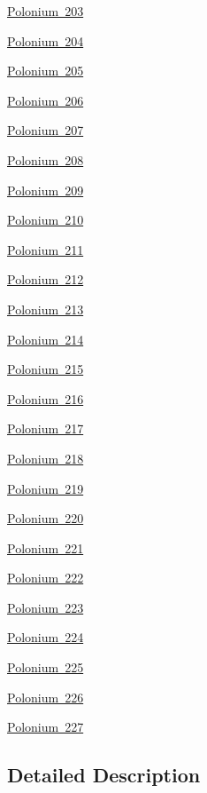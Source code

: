 \begin{DoxyCompactItemize}
\mbox{\hyperlink{group___isotope_const-_polonium-_po203}{Polonium 203}}
\item 
\mbox{\hyperlink{group___isotope_const-_polonium-_po204}{Polonium 204}}
\item 
\mbox{\hyperlink{group___isotope_const-_polonium-_po205}{Polonium 205}}
\item 
\mbox{\hyperlink{group___isotope_const-_polonium-_po206}{Polonium 206}}
\item 
\mbox{\hyperlink{group___isotope_const-_polonium-_po207}{Polonium 207}}
\item 
\mbox{\hyperlink{group___isotope_const-_polonium-_po208}{Polonium 208}}
\item 
\mbox{\hyperlink{group___isotope_const-_polonium-_po209}{Polonium 209}}
\item 
\mbox{\hyperlink{group___isotope_const-_polonium-_po210}{Polonium 210}}
\item 
\mbox{\hyperlink{group___isotope_const-_polonium-_po211}{Polonium 211}}
\item 
\mbox{\hyperlink{group___isotope_const-_polonium-_po212}{Polonium 212}}
\item 
\mbox{\hyperlink{group___isotope_const-_polonium-_po213}{Polonium 213}}
\item 
\mbox{\hyperlink{group___isotope_const-_polonium-_po214}{Polonium 214}}
\item 
\mbox{\hyperlink{group___isotope_const-_polonium-_po215}{Polonium 215}}
\item 
\mbox{\hyperlink{group___isotope_const-_polonium-_po216}{Polonium 216}}
\item 
\mbox{\hyperlink{group___isotope_const-_polonium-_po217}{Polonium 217}}
\item 
\mbox{\hyperlink{group___isotope_const-_polonium-_po218}{Polonium 218}}
\item 
\mbox{\hyperlink{group___isotope_const-_polonium-_po219}{Polonium 219}}
\item 
\mbox{\hyperlink{group___isotope_const-_polonium-_po220}{Polonium 220}}
\item 
\mbox{\hyperlink{group___isotope_const-_polonium-_po221}{Polonium 221}}
\item 
\mbox{\hyperlink{group___isotope_const-_polonium-_po222}{Polonium 222}}
\item 
\mbox{\hyperlink{group___isotope_const-_polonium-_po223}{Polonium 223}}
\item 
\mbox{\hyperlink{group___isotope_const-_polonium-_po224}{Polonium 224}}
\item 
\mbox{\hyperlink{group___isotope_const-_polonium-_po225}{Polonium 225}}
\item 
\mbox{\hyperlink{group___isotope_const-_polonium-_po226}{Polonium 226}}
\item 
\mbox{\hyperlink{group___isotope_const-_polonium-_po227}{Polonium 227}}
\end{DoxyCompactItemize}


\subsection{Detailed Description}
